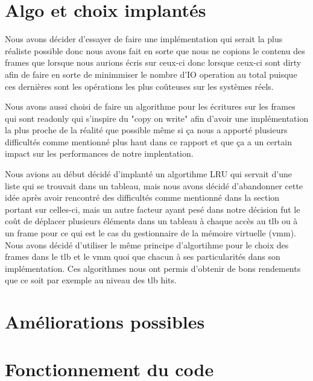 \documentclass{article}
\begin{document}
\section{Algo et choix implantés}
Nous avons décider d'essayer de faire une implémentation qui serait la plus réaliste possible donc nous avons fait en sorte que nous ne copions le contenu des frames que lorsque nous aurions écris sur ceux-ci donc lorsque ceux-ci sont dirty afin de faire en sorte de minimmiser le nombre d'IO operation au total puisque ces dernières sont les opérations les plus coûteuses sur les systèmes réels. 
\par
Nous avons aussi choisi de faire un algorithme pour les écritures sur les frames qui sont readonly qui s'inspire du "copy on write" afin d'avoir une implémentation la plus proche de la réalité que possible même si ça nous a apporté plusieurs difficultés comme mentionné  plus haut dans ce rapport et que ça a un certain impact sur les performances de notre implentation.
\par 
Nous avions au début décidé d'implanté un algortihme LRU qui servait d'une liste qui se trouvait dans un tableau, mais nous avons décidé d'abandonner cette idée après avoir rencontré des difficultés comme mentionné dans la section portant sur celles-ci, mais un autre facteur ayant pesé dans notre décision fut le coût de déplacer plusieurs éléments dans un tableau à chaque accès au tlb ou à un frame pour ce qui est le cas du gestionnaire de la mémoire virtuelle (vmm). Nous avons décidé d'utiliser le même principe d'algortihme pour le choix des frames dans le tlb et le vmm quoi que chacun à ses particularités dans son  implémentation.  Ces algorithmes nous ont permis d'obtenir de bons rendements que ce soit par exemple au niveau des tlb hits.
\section{Améliorations possibles}


\section{Fonctionnement du code}
\end{document}
